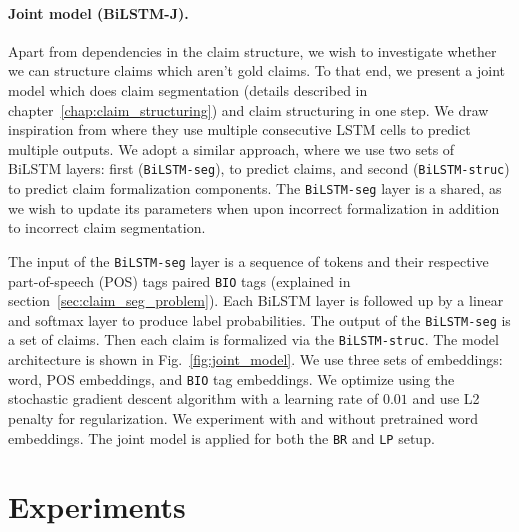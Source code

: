 \paragraph{Joint model (BiLSTM-J). } 
Apart from dependencies in the claim structure, we wish to investigate whether
we can structure claims which aren't gold claims.  To that end, we present a
joint model which does claim segmentation (details described in
chapter~\ref{chap:claim_structuring}) and claim structuring in one step. We
draw inspiration from \citep{miwa2016end} where they use multiple consecutive
LSTM cells to predict multiple outputs. We adopt a similar approach, where we
use two sets of BiLSTM layers: first (\texttt{BiLSTM-seg}), to predict claims, and
second (\texttt{BiLSTM-struc}) to predict claim formalization components.  The
\texttt{BiLSTM-seg} layer is a shared, as we wish to update its parameters
when upon incorrect formalization in addition to incorrect claim segmentation.

The input of the \texttt{BiLSTM-seg} layer is a sequence of tokens and their
respective part-of-speech (POS) tags \citep{brown1957linguistic} paired \texttt{BIO}
tags (explained in section~\ref{sec:claim_seg_problem}). 
Each BiLSTM layer is followed up by a linear and softmax layer to produce 
label probabilities. The output of the
\texttt{BiLSTM-seg} is a set of claims. Then each claim is formalized via the
\texttt{BiLSTM-struc}.  The model architecture is shown in Fig.~\ref{fig:joint_model}. 
We use three sets of embeddings: word, POS embeddings, and \texttt{BIO} tag
embeddings. We optimize using the stochastic gradient descent algorithm
with a learning rate of $0.01$ and use L2 penalty for regularization. 
We experiment with and without pretrained word embeddings. 
The joint model is applied for both the \texttt{BR} and 
\texttt{LP} setup. 

\section{Experiments}
\label{sec:claim_struc_experiment}

